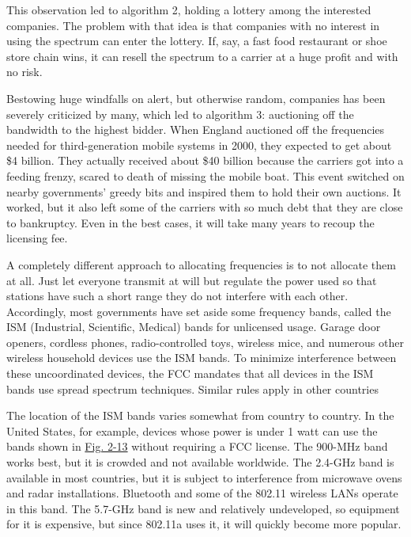 This observation led to algorithm 2, holding a lottery among the
interested companies. The problem with that idea is that companies with
no interest in using the spectrum can enter the lottery. If, say, a fast
food restaurant or shoe store chain wins, it can resell the spectrum to
a carrier at a huge profit and with no risk.

Bestowing huge windfalls on alert, but otherwise random, companies has
been severely criticized by many, which led to algorithm 3: auctioning
off the bandwidth to the highest bidder. When England auctioned off the
frequencies needed for third-generation mobile systems in 2000, they
expected to get about \$4 billion. They actually received about \$40
billion because the carriers got into a feeding frenzy, scared to death
of missing the mobile boat. This event switched on nearby governments'
greedy bits and inspired them to hold their own auctions. It worked, but
it also left some of the carriers with so much debt that they are close
to bankruptcy. Even in the best cases, it will take many years to recoup
the licensing fee.

A completely different approach to allocating frequencies is to not
allocate them at all. Just let everyone transmit at will but regulate
the power used so that stations have such a short range they do not
interfere with each other. Accordingly, most governments have set aside
some frequency bands, called the {ISM} ({Industrial, Scientific,
Medical}) bands for unlicensed usage. Garage door openers, cordless
phones, radio-controlled toys, wireless mice, and numerous other
wireless household devices use the ISM bands. To minimize interference
between these uncoordinated devices, the FCC mandates that all devices
in the ISM bands use spread spectrum techniques. Similar rules apply in
other countries

The location of the ISM bands varies somewhat from country to country.
In the United States, for example, devices whose power is under 1 watt
can use the bands shown in
\protect\hyperlink{0130661023_ch02lev1sec3.htmlux5cux23ch02fig13}{Fig.
2-13} without requiring a FCC license. The 900-MHz band works best, but
it is crowded and not available worldwide. The 2.4-GHz band is available
in most countries, but it is subject to interference from microwave
ovens and radar installations. Bluetooth and some of the 802.11 wireless
LANs operate in this band. The 5.7-GHz band is new and relatively
undeveloped, so equipment for it is expensive, but since 802.11a uses
it, it will quickly become more popular.

